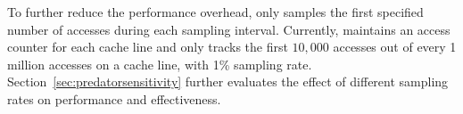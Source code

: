 To further reduce the performance overhead, \Predator{} only samples the first specified number of accesses during each sampling interval. 
Currently, \Predator{} maintains an access counter for each cache line
and only tracks the first $10,000$ accesses out of every 1 million accesses on a cache line, with 1\% sampling rate. Section~\ref{sec:predatorsensitivity} further evaluates the effect of different sampling rates on performance and effectiveness.  

